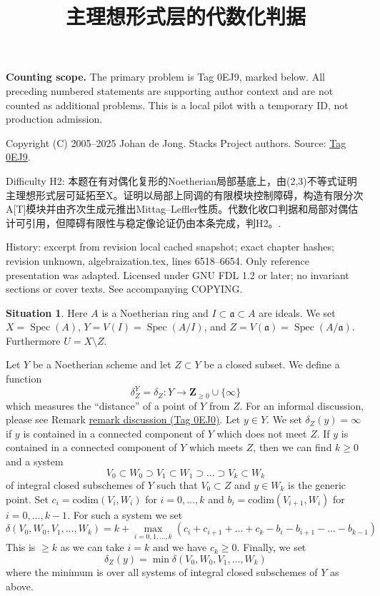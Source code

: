 \documentclass{amsart}
\theoremstyle{plain}
\theoremstyle{definition}
\newtheorem{situation}[subsection]{Situation}
\theoremstyle{remark}
\numberwithin{equation}{subsection}
\def\Spec{\mathop{\mathrm{Spec}}}
\begin{document}
\title[Stacks Project, Tag 0EJ9]{主理想形式层的代数化判据}
\maketitle
\noindent\textbf{Counting scope.} The primary problem is Tag 0EJ9, marked below. All preceding numbered statements are supporting author context and are not counted as additional problems. This is a local pilot with a temporary ID, not production admission.


\noindent Copyright (C) 2005--2025 Johan de Jong. Stacks Project authors. Source: \href{https://stacks.math.columbia.edu/tag/0EJ9}{Tag 0EJ9}.

\noindent Difficulty H2: 本题在有对偶化复形的Noetherian局部基底上，由(2,3)不等式证明主理想形式层可延拓至X。证明以局部上同调的有限模块控制障碍，构造有限分次A[T]模块并由齐次生成元推出Mittag–Leffler性质。代数化收口判据和局部对偶估计可引用，但障碍有限性与稳定像论证仍由本条完成，判H2。.

\noindent History: excerpt from revision local cached snapshot; exact chapter hashes; revision unknown, algebraization.tex, lines 6518--6654. Only reference presentation was adapted. Licensed under GNU FDL 1.2 or later; no invariant sections or cover texts. See accompanying COPYING.

\begin{situation}
\label{situation-algebraize}
Here $A$ is a Noetherian ring and $I \subset \mathfrak a \subset A$ are ideals.
We set $X = \Spec(A)$, $Y = V(I) = \Spec(A/I)$, and
$Z = V(\mathfrak a) = \Spec(A/\mathfrak a)$. Furthermore $U = X \setminus Z$.
\end{situation}

\noindent
Let $Y$ be a Noetherian scheme and let $Z \subset Y$ be a closed subset.
We define a function
\begin{equation}
\label{equation-delta-Z}
\delta^Y_Z = \delta_Z : Y \longrightarrow \mathbf{Z}_{\geq 0} \cup \{\infty\}
\end{equation}
which measures the ``distance'' of a point of $Y$ from $Z$.
For an informal discussion, please see Remark \href{https://stacks.math.columbia.edu/tag/0EJ0}{remark discussion (Tag 0EJ0)}.
Let $y \in Y$. We set $\delta_Z(y) = \infty$ if $y$ is contained
in a connected component of $Y$ which does not meet $Z$.
If $y$ is contained in a connected component of $Y$ which meets $Z$,
then we can find $k \geq 0$ and a system
$$
V_0 \subset W_0 \supset V_1 \subset W_1 \supset \ldots \supset
V_k \subset W_k
$$
of integral closed subschemes of $Y$ such that $V_0 \subset Z$
and $y \in W_k$ is the generic point. Set
$c_i = \text{codim}(V_i, W_i)$ for $i = 0, \ldots, k$
and $b_i = \text{codim}(V_{i + 1}, W_i)$ for $i = 0, \ldots, k - 1$.
For such a system we set
$$
\delta(V_0, W_0, V_1, \ldots, W_k) =
k +
\max_{i = 0, 1, \ldots, k}
(c_i + c_{i + 1} + \ldots + c_k - b_i - b_{i + 1} - \ldots - b_{k - 1})
$$
This is $\geq k$ as we can take $i = k$ and we have $c_k \geq 0$.
Finally, we set
$$
\delta_Z(y) = \min \delta(V_0, W_0, V_1, \ldots, W_k)
$$
where the minimum is over all systems of integral closed subschemes of $Y$
as above.
\end{document}

